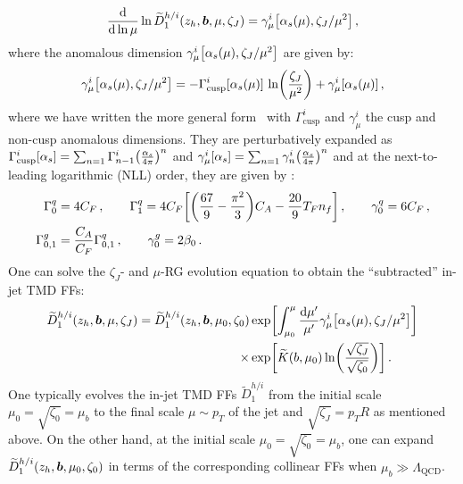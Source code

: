\documentclass[a4paper, 11 pt]{article}
\begin{document}
\begin{align}
\frac{\dd{}}{\dd{\ln{\mu}}} \ln{\widetilde{D}_1^{h/i} \pqty{z_h, \boldsymbol{b}, \mu, \zeta_J}}
=
\gamma_\mu^i \bqty{\alpha_s(\mu), \zeta_J/\mu^2}
\, , \label{e.mu_D}
\end{align}
where the anomalous dimension $\gamma_\mu^i \bqty{\alpha_s(\mu), \zeta_J/\mu^2}$ are given by:
\begin{align}
\gamma_\mu^i \bqty{\alpha_s(\mu), \zeta_J/\mu^2}
= - \Gamma_{\mathrm{cusp}}^i \bqty{\alpha_s(\mu)} \,
\ln(\frac{\zeta_J}{\mu^2})
+
\gamma_\mu^i \bqty{\alpha_s(\mu)}
\, , \label{e.mu-dimension}
\end{align}
where we have written the more general form~\cite{Boussarie:2023izj} with $\Gamma_{\mathrm{cusp}}^i$ and $\gamma_\mu^i$ the cusp and non-cusp anomalous dimensions.
They are perturbatively expanded as $\Gamma_{\mathrm{cusp}}^i \bqty{\alpha_s} = \sum_{n=1} \Gamma_{n-1}^i \pqty{\frac{\alpha_s}{4\pi}}^n$ and $\gamma_\mu^i \bqty{\alpha_s} = \sum_{n=1} \gamma_{n}^i \pqty{\frac{\alpha_s}{4\pi}}^n$
and at the next-to-leading logarithmic (NLL) order, they are given by \cite{Becher:2006mr, Jain:2011xz}:
\begin{align}
\Gamma_0^q & = 4 C_F
\, , \qquad
\Gamma_1^q = 4 C_F \bqty{\pqty{\frac{67}{9}-\frac{\pi^2}{3}} C_A - \frac{20}{9} T_F n_f} \, , \qquad
\gamma_0^q = 6 C_F \, , \\
\Gamma_{0,1}^g & = \frac{C_A}{C_F}\Gamma_{0,1}^q \, , \qquad
\gamma_0^g = 2 \beta_0 \, .
\end{align}
One can solve the $\zeta_J$- and $\mu$-RG evolution equation to obtain the ``subtracted'' in-jet TMD FFs:
\begin{align}
\widetilde{D}_1^{h/i} \pqty{z_h, \boldsymbol{b}, \mu, \zeta_J}
=
\widetilde{D}_1^{h/i} \pqty{z_h, \boldsymbol{b}, \mu_0, \zeta_0} 
& \exp[\int_{\mu_0}^\mu \frac{\dd{\mu'}}{\mu'} \gamma_\mu^i \bqty{\alpha_s(\mu), \zeta_J/\mu^2}]
\nonumber\\
\times &
\exp[\widetilde{K}(b, \mu_0)\ln(\frac{\sqrt{\zeta_J}}{\sqrt{\zeta_0}})]
\, . \label{e.D_1_evolution}
\end{align}
One typically evolves the in-jet TMD FFs $\widetilde{D}_1^{h/i}$ from the initial scale $\mu_0 = \sqrt{\zeta_0} = \mu_b$ to the final scale $\mu\sim p_T$ of the jet and $\sqrt{\zeta_J} = p_T R$ as mentioned above.
On the other hand, at the initial scale $\mu_0 = \sqrt{\zeta_0} = \mu_b$, one can expand $\widetilde{D}_1^{h/i} \pqty{z_h, \boldsymbol{b}, \mu_0, \zeta_0}$ in terms of the corresponding collinear FFs when $\mu_b \gg \Lambda_{\mathrm{QCD}}$. 
\end{document}

